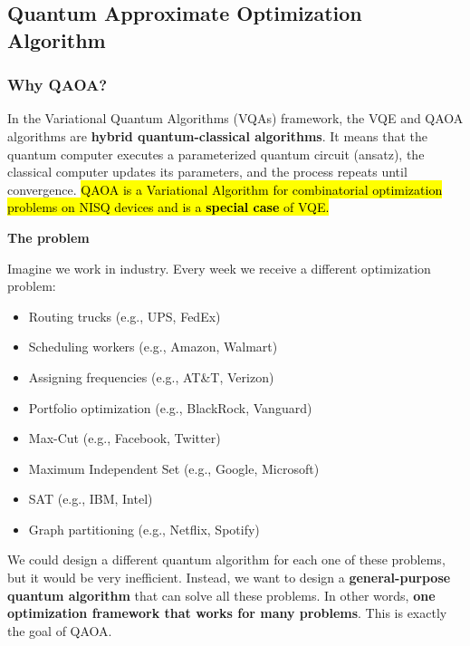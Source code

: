 \subsection{Quantum Approximate Optimization Algorithm}\label{sec:quantum-approximate-optimization-algorithm-qaoa}

\subsubsection{Why QAOA?}\label{sec:why-qaoa}

In the Variational Quantum Algorithms (VQAs) framework, the VQE and QAOA algorithms are \textbf{hybrid quantum-classical algorithms}. It means that the quantum computer executes a parameterized quantum circuit (ansatz), the classical computer updates its parameters, and the process repeats until convergence. \hl{QAOA is a Variational Algorithm for combinatorial optimization problems on NISQ devices and is a \textbf{special case} of VQE.}

\highspace
\begin{flushleft}
    \textcolor{Red2}{ \textbf{The problem}}
\end{flushleft}
Imagine we work in industry. Every week we receive a different optimization problem:
\begin{itemize}
    \item Routing trucks (e.g., UPS, FedEx)
    \item Scheduling workers (e.g., Amazon, Walmart)
    \item Assigning frequencies (e.g., AT\&T, Verizon)
    \item Portfolio optimization (e.g., BlackRock, Vanguard)
    \item Max-Cut (e.g., Facebook, Twitter)
    \item Maximum Independent Set (e.g., Google, Microsoft)
    \item SAT (e.g., IBM, Intel)
    \item Graph partitioning (e.g., Netflix, Spotify)
\end{itemize}
We could design a different quantum algorithm for each one of these problems, but it would be very inefficient. Instead, we want to design a \textbf{general-purpose quantum algorithm} that can solve all these problems. In other words, \textbf{one optimization framework that works for many problems}. This is exactly the goal of QAOA.

